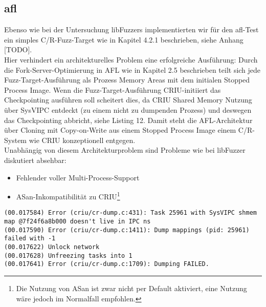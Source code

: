 \documentclass[a4paper]{article}
\begin{document}
\subsection{afl}
Ebenso wie bei der Untersuchung libFuzzers implementierten wir für den afl-Test ein simples C/R-Fuzz-Target wie in Kapitel 4.2.1 beschrieben, siehe Anhang [TODO].\\
Hier verhindert ein architekturelles Problem eine erfolgreiche Ausführung:
Durch die Fork-Server-Optimierung in AFL wie in Kapitel 2.5 beschrieben teilt sich jede Fuzz-Target-Ausführung als Prozess Memory Areas mit dem initialen Stopped Process Image. 
Wenn die Fuzz-Target-Ausführung CRIU-initiiert das Checkpointing ausführen soll scheitert dies, da CRIU Shared Memory Nutzung über SysVIPC entdeckt (zu einem nicht zu dumpenden Prozess) und deswegen das Checkpointing abbricht, siehe Listing 12.
Damit steht die AFL-Architektur über Cloning mit Copy-on-Write aus einem Stopped Process Image einem C/R-System wie CRIU konzeptionell entgegen.\\
Unabhängig von diesem Architekturproblem sind Probleme wie bei libFuzzer diskutiert absehbar:
\begin{itemize}
    \item Fehlender voller Multi-Process-Support
    \item ASan-Inkompatibilität zu CRIU\footnote{Die Nutzung von ASan ist zwar nicht per Default aktiviert, eine Nutzung wäre jedoch im Normalfall empfohlen.}
\end{itemize}

\begin{lstlisting}[caption=Checkpointing Error durch Shared Memory]
(00.017584) Error (criu/cr-dump.c:431): Task 25961 with SysVIPC shmem map @7f24f6a8b000 doesn't live in IPC ns
(00.017590) Error (criu/cr-dump.c:1411): Dump mappings (pid: 25961) failed with -1
(00.017622) Unlock network
(00.017628) Unfreezing tasks into 1
(00.017641) Error (criu/cr-dump.c:1709): Dumping FAILED.
\end{lstlisting}
\end{document}

